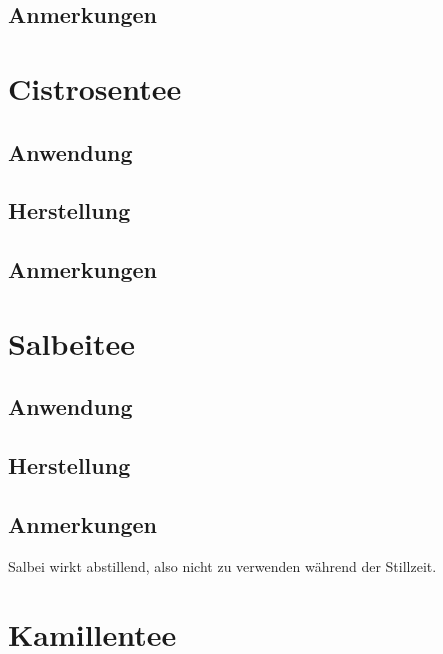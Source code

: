 \subsection{Anmerkungen}


\newpage


\section{Cistrosentee}


\subsection{Anwendung}

\subsection{Herstellung}

\subsection{Anmerkungen}



\newpage


\section{Salbeitee}

  

\subsection{Anwendung}

\subsection{Herstellung}

\subsection{Anmerkungen}

Salbei wirkt abstillend, also nicht zu verwenden während der Stillzeit.


\newpage


\section{Kamillentee}

